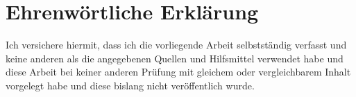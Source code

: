 \section*{Ehrenwörtliche Erklärung}
\label{sec:declaration_of_honour}

Ich versichere hiermit, dass ich die vorliegende Arbeit selbstständig verfasst und keine anderen als die 
angegebenen Quellen und Hilfsmittel verwendet habe und diese Arbeit bei keiner anderen Prüfung mit 
gleichem oder vergleichbarem Inhalt vorgelegt habe und diese bislang nicht veröffentlich wurde. 

